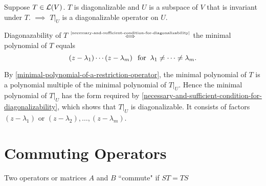 \setcounter{thm}{64}
\begin{thm}
  \label{restriction-ofdiagonalizable-operator-to-invariant-subspace}
  Suppose $T\in \mathcal{L}(V)$. $T$ is diagonalizable and $U$ is a subspace of $V$ that is invariant under $T$. $\implies$ $\left.T\right|_U$ is a diagonalizable operator on $U$.
\end{thm}
\begin{prf}
  Diagonazability of $T$ $\mathsmaller{\overset{\text{\ref{necessary-and-sufficient-condition-for-diagonalizability}}}{\iff}}$ the minimal polynomial of $T$ equals 
  \begin{equation}
    (z-\lambda_1)\cdots(z-\lambda_m) \;\;\, \text{for}\;\; \lambda_1 \neq \cdots \neq \lambda_m.
  \end{equation} 
  
  By \ref{minimal-polynomial-of-a-restriction-operator}, the minimal polynomial of $T$ is a polynomial multiple of the minimal polynomial of $\left.T\right|_U$. Hence the minimal polynomial of $\left.T\right|_U$  has the form required by \ref{necessary-and-sufficient-condition-for-diagonalizability}, which shows that $\left.T\right|_U$ is diagonalizable. It consists of factors $(z-\lambda_1)$ or $(z-\lambda_2), \dots, (z-\lambda_m)$.
  
\end{prf}


\section{Commuting Operators}
\begin{mydef}
  Two operators or matrices $A$ and $B$ ``commute" if $ST=TS$
\end{mydef}